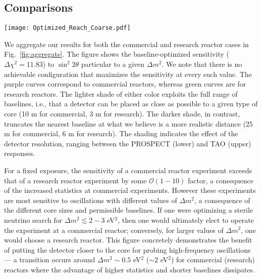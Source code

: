 \documentclass[prd, twocolumn, tightenlines, twoside, secnumarabic, superscriptaddress, preprintnumbers, nofootinbib, notitlepage]{revtex4-1}
\begin{document}
\subsection{Comparisons}
\label{sec:comp}
  
\begin{figure*}[t]
    \texttt{[image: Optimized\_Reach\_Coarse.pdf]}
    \caption{The baseline-optimized sensitivity ($\Delta \chi^2 = 11.83$) to $\sin^2 2\theta$ as a function of $\Delta m^2$. The purple (green) curves are for a commercial (research) reactor. The lighter band of either color represents the sensitivity with optimistic assumptions about the possible closest baseline; the darker bands represent more realistic assumptions. The weakest (strongest) sensitivity of each color corresponds to a PROSPECT-like (TAO-like) energy resolution. Also shown is the 95\% C.L. sensitivity from KATRIN (dashed gray), as well as the $3\sigma$-preferred regions from Neutrino-4 \cite{Neutrino4talk} (red) and from the global analysis of Ref.~\cite{Berryman:2020agd} (blue).}
    \label{fig:aggregate}
\end{figure*}

We aggregate our results for both the commercial and research reactor cases in Fig.~\ref{fig:aggregate}. The figure shows the baseline-optimized sensitivity ($\Delta \chi^2=11.83$) to $\sin^2 2\theta$ particular to a given $\Delta m^2$. We note that there is no achievable configuration that maximizes the sensitivity at every such value. The purple curves correspond to commercial reactors, whereas green curves are for research reactors. The lighter shade of either color exploits the full range of baselines, i.e., that a detector can be placed as close as possible to a given type of core (10 m for commercial, 3 m for research). The darker shade, in contrast, truncates the nearest baseline at what we believe is a more realistic distance (25 m for commercial, 6 m for research). The shading indicates the effect of the detector resolution, ranging between the PROSPECT (lower) and TAO (upper) responses.

For a fixed exposure, the sensitivity of a commercial reactor experiment exceeds that of a research reactor experiment by some $\mathcal{O}(1-10)$ factor, a consequence of the increased statistics at commercial experiments. However these experiments are most sensitive to oscillations with different values of $\Delta m^2$, a consequence of the different core sizes and permissible baselines. If one were optimizing a sterile neutrino search for $\Delta m^2 \lesssim 2-3$ eV$^2$, then one would ultimately elect to operate the experiment at a commercial reactor; conversely, for larger values of $\Delta m^2$, one would choose a research reactor. This figure concretely demonstrates the benefit of putting the detector closer to the core for probing high-frequency oscillations --- a transition occurs around $\Delta m^2 \sim 0.5$ eV$^2$ ($\sim 2$ eV$^2$) for commercial (research) reactors where the advantage of higher statistics and shorter baselines dissipates.
\end{document}
